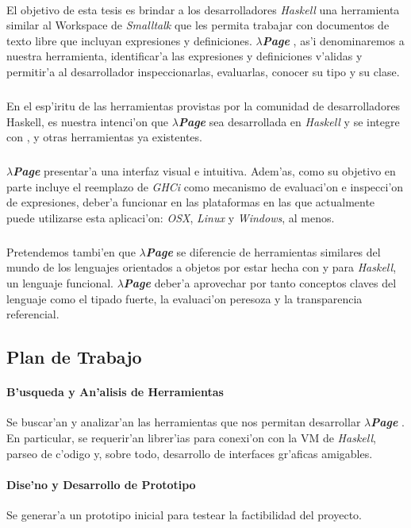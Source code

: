 \documentclass[a4paper]{article}
\newcommand{\hpage}{\textbf{\textsl{$\lambda$Page}} }
\begin{document}
\paragraph{}El objetivo de esta tesis es brindar a los desarrolladores \textit{Haskell} una herramienta similar al Workspace de \textit{Smalltalk} que les permita trabajar con documentos de texto libre que incluyan expresiones y definiciones.  \hpage, as'i denominaremos a nuestra herramienta, identificar'a las expresiones y definiciones v'alidas y permitir'a al desarrollador inspeccionarlas, evaluarlas, conocer su tipo y su clase.
\subparagraph{}En el esp'iritu de las herramientas provistas por la comunidad de desarrolladores Haskell, es nuestra intenci'on que \hpage sea desarrollada en \textit{Haskell} y se integre con ,  y otras herramientas ya existentes.
\subparagraph{} \hpage presentar'a una interfaz visual e intuitiva. Adem'as, como su objetivo en parte incluye el reemplazo de \textsl{GHCi} como mecanismo de evaluaci'on e inspecci'on de expresiones, deber'a funcionar en las plataformas en las que actualmente puede utilizarse esta aplicaci'on: \textsl{OSX}, \textsl{Linux} y \textsl{Windows}, al menos.
\subparagraph{}Pretendemos tambi'en que \hpage se diferencie de herramientas similares del mundo de los lenguajes orientados a objetos por estar hecha con y para \textit{Haskell}, un lenguaje funcional.  \hpage deber'a aprovechar por tanto conceptos claves del lenguaje como el tipado fuerte, la evaluaci'on peresoza y la transparencia referencial.

\subsection{Plan de Trabajo}
\paragraph{B'usqueda y An'alisis de Herramientas} Se buscar'an y analizar'an las herramientas que nos permitan desarrollar \hpage.  En particular, se requerir'an librer'ias para conexi'on con la VM de \textit{Haskell}, parseo de c'odigo y, sobre todo, desarrollo de interfaces gr'aficas amigables.
\paragraph{Dise'no y Desarrollo de Prototipo} Se generar'a un prototipo inicial para testear la factibilidad del proyecto.
\end{document}
